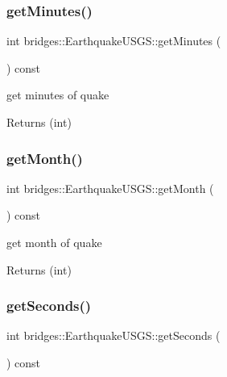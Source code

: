 \subsubsection{\texorpdfstring{getMinutes()}{getMinutes()}}
{\footnotesize\ttfamily int bridges\+::\+Earthquake\+U\+S\+G\+S\+::get\+Minutes (\begin{DoxyParamCaption}{ }\end{DoxyParamCaption}) const\hspace{0.3cm}{\ttfamily [inline]}}

get minutes of quake

\begin{DoxyReturn}{Returns}
(int) 
\end{DoxyReturn}
\mbox{\label{classbridges_1_1_earthquake_u_s_g_s_a9367d4cf0135f850df4398e6e4be3192}} 
\subsubsection{\texorpdfstring{getMonth()}{getMonth()}}
{\footnotesize\ttfamily int bridges\+::\+Earthquake\+U\+S\+G\+S\+::get\+Month (\begin{DoxyParamCaption}{ }\end{DoxyParamCaption}) const\hspace{0.3cm}{\ttfamily [inline]}}

get month of quake

\begin{DoxyReturn}{Returns}
(int) 
\end{DoxyReturn}
\mbox{\label{classbridges_1_1_earthquake_u_s_g_s_a92e8f541ed8287cc04ec4c5321e3c374}} 
\subsubsection{\texorpdfstring{getSeconds()}{getSeconds()}}
{\footnotesize\ttfamily int bridges\+::\+Earthquake\+U\+S\+G\+S\+::get\+Seconds (\begin{DoxyParamCaption}{ }\end{DoxyParamCaption}) const\hspace{0.3cm}{\ttfamily [inline]}}

